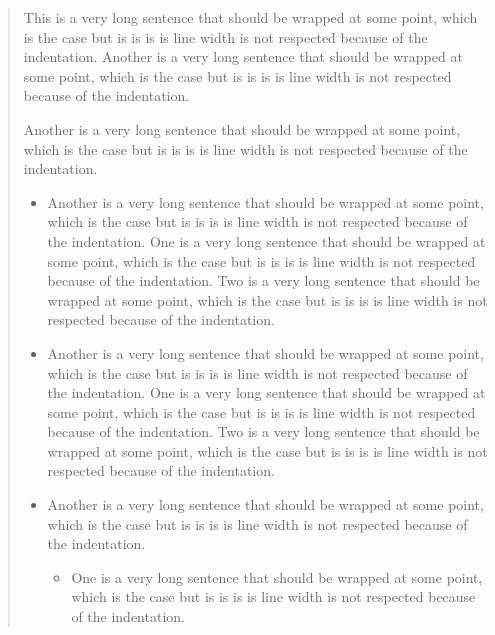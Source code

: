 \begin{abstract}
    This is a very long sentence that should be wrapped at some point, which is the case but is is
    is is line width is not respected because of the indentation.
    Another is a very long sentence that should be wrapped at some point, which is the case but is
    is is is line width is not respected because of the indentation.
    \begin{another}
        Another is a very long sentence that should be wrapped at some point, which is the case
        but is is is is line width is not respected because of the indentation.
        \begin{itemize}
            \item
                  Another is a very long sentence that should be wrapped at some point, which is
                  the case but is is is is line width is not respected because of the indentation.
                  One is a very long sentence that should be wrapped at some point, which is the
                  case but is is is is line width is not respected because of the indentation.
                  Two is a very long sentence that should be wrapped at some point, which is the
                  case but is is is is line width is not respected because of the indentation.
            \item
                  Another is a very long sentence that should be wrapped at some point, which is
                  the case but is is is is line width is not respected because of the indentation.
                  One is a very long sentence that should be wrapped at some point, which is the
                  case but is is is is line width is not respected because of the indentation.
                  Two is a very long sentence that should be wrapped at some point, which is the
                  case but is is is is line width is not respected because of the indentation.
            \item
                  Another is a very long sentence that should be wrapped at some point, which is
                  the case but is is is is line width is not respected because of the indentation.
                  \begin{itemize}
                      \item
                            One is a very long sentence that should be wrapped at some point,
                            which is the case but is is is is line width is not respected because
                            of the indentation.

\end{itemize}
\end{itemize}
\end{another}
\end{abstract}
